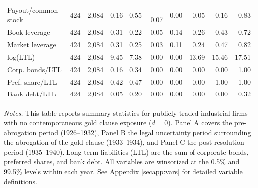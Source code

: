 \begin{table}[p]
\begin{threeparttable}
\begin{tabular}{lrrrrrrrrr}
            Payout/common stock & 424 & 2,084 & 0.16 & 0.55 & $-$0.07 & 0.00 & 0.05 & 0.16 & 0.83 \\
            Book leverage & 424 & 2,084 & 0.31 & 0.22 & 0.05 & 0.14 & 0.26 & 0.43 & 0.72 \\
            Market leverage & 424 & 2,084 & 0.31 & 0.25 & 0.03 & 0.11 & 0.24 & 0.47 & 0.82 \\
            log(LTL) & 424 & 2,084 & 9.45 & 7.38 & 0.00 & 0.00 & 13.69 & 15.46 & 17.51 \\
            Corp. bonds/LTL & 424 & 2,084 & 0.16 & 0.34 & 0.00 & 0.00 & 0.00 & 0.00 & 1.00 \\
            Pref. share/LTL & 424 & 2,084 & 0.42 & 0.47 & 0.00 & 0.00 & 0.00 & 1.00 & 1.00 \\
            Bank debt/LTL & 424 & 2,084 & 0.05 & 0.20 & 0.00 & 0.00 & 0.00 & 0.00 & 0.32 \\
            \bottomrule
        \end{tabular}
    \end{threeparttable}

    \vspace*{3mm} \justifying \noindent
\scriptsize{\textit{Notes.} This table reports summary statistics for publicly traded industrial firms with no contemporaneous gold clause exposure ($d = 0$). Panel A covers the pre-abrogation period (1926--1932), Panel B the legal uncertainty period surrounding the abrogation of the gold clause (1933--1934), and Panel C the post-resolution period (1935--1940). Long-term liabilities (LTL) are the sum of corporate bonds, preferred shares, and bank debt. All variables are winsorized at the 0.5\% and 99.5\% levels within each year. See Appendix \ref{secapp:vars} for detailed variable definitions.}
\end{table}